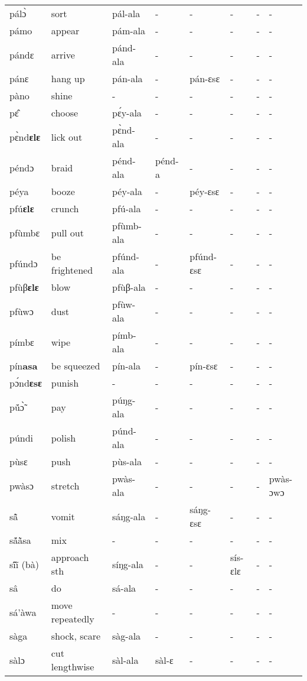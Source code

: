 \begin{sidewaystable}
\begin{longtable}{lp{3.5cm}llllll}
pálɔ̀ & sort & pál-ala & - & - & - & - & - \\
pámo & appear & pám-ala & - & - & - & - & - \\
pándɛ & arrive & pánd-ala & - & - & - & - & - \\
pánɛ & hang up & pán-ala &  - & pán-ɛsɛ & - &  - & -  \\
pàno & shine & - & - & - & - & - & - \\
pɛ̂ & choose & pɛ́y-ala & - & - & - & - & - \\
pɛ̀nd{\bfseries ɛlɛ} & lick out  & pɛ̀nd-ala & - & - & - & - & - \\
péndɔ & braid & pénd-ala & pénd-a & - & - & - & - \\
péya & booze & péy-ala & - & péy-ɛsɛ & - &  - & - \\
pfú{\bfseries ɛlɛ} & crunch & pfú-ala & - & - & - & - &  - \\
pfùmbɛ & pull out & pfùmb-ala & - &  - & - & - & -  \\
pfúndɔ & be frightened & pfúnd-ala & - & pfúnd-ɛsɛ & - &  - & - \\
pfùβ{\bfseries ɛlɛ} & blow & pfùβ-ala & - & - & - & - &  - \\
pfùwɔ & dust & pfùw-ala & - & - & -  & - & - \\
pímbɛ & wipe & pímb-ala & - & - & - & - & - \\
pín{\bfseries asa} & be squeezed & pín-ala & - & pín-ɛsɛ & - &  - & - \\
pɔ́nd{\bfseries ɛsɛ} & punish & - & - & - & - & - & - \\
pṹɔ̃̀ & pay & púŋg-ala & - & - & - & - & - \\
púndi & polish & púnd-ala & - & - & - & - & - \\
pùsɛ & push & pùs-ala & - & - & - & - & - \\
pwàsɔ & stretch & pwàs-ala  & - & - & - & - &  pwàs-ɔwɔ \\
sã̂ & vomit &  sáŋg-ala & - & sáŋg-ɛsɛ & - &  - & - \\
sã́ã̀sa & mix & - & - & - & - & - & - \\
sĩ́ĩ̀ (bà) & approach sth & síŋg-ala & - & - & sís-ɛlɛ & - & - \\
sâ & do & sá-ala & - & - & -  & - & - \\
sá'àwa & move repeatedly & - & - & - & - & - & - \\
sàga & shock, scare  & sàg-ala &  - & - &  - & - & - \\
sàlɔ & cut lengthwise & sàl-ala &  sàl-ɛ & - & - & - & - \\ 

\end{longtable}
\end{sidewaystable}
